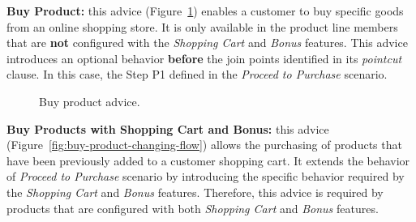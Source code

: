 \documentclass{acm_proc_article-sp}
\begin{document}
{\bf Buy Product:} this advice (Figure~\ref{fig:buy-product-scenario}) enables
a customer to buy specific goods from an online shopping store. It is only
available in the product line members that are {\bf not} configured with
the \emph{Shopping Cart} and \emph{Bonus} features. 
This advice introduces an optional behavior {\bf before} the join points
identified in its \emph{pointcut} clause. In this case, the Step P1 defined in
the \emph{Proceed to Purchase} scenario. 

\begin{figure}[h]
\caption{Buy product advice.}
\label{fig:buy-product-scenario}
\end{figure}


{\bf Buy Products with Shopping Cart and Bonus:} this advice
(Figure~\ref{fig:buy-product-changing-flow}) allows the purchasing of products
that have been previously added to a customer shopping cart. It extends the
behavior of \emph{Proceed to Purchase} scenario by introducing the specific 
behavior required by the \emph{Shopping Cart} and
\emph{Bonus} features. Therefore, this advice is required by products that
are configured with both \emph{Shopping Cart} and \emph{Bonus} features.
\end{document}
